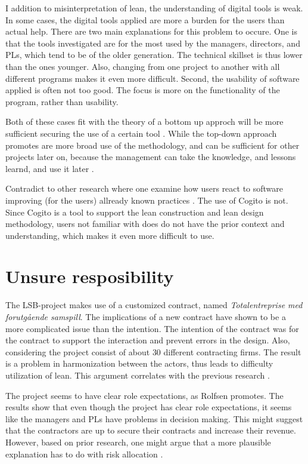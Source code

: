 I addition to misinterpretation of lean, the understanding of digital tools is weak. In some cases, the digital tools applied are more a burden for the users than actual help. There are two main explanations for this problem to occure. One is that the tools investigated are for the most used by the managers, directors, and PLs, which tend to be of the older generation. The technical skillset is thus lower than the ones younger. Also, changing from one project to another with all different programs makes it even more difficult. Second, the usability of software applied is often not too good. The focus is more on the functionality of the program, rather than usability. 

Both of these cases fit with the theory of a bottom up approch will be more sufficient securing the use of a certain tool \cite{Robey&Sahay}. While the top-down approach promotes are more broad use of the methodology, and can be sufficient for other projects later on, because the management can take the knowledge, and lessons learnd, and use it later \cite{lean_i_praksis}. 

Contradict to other research where one examine how users react to software improving (for the users) allready known practices \cite{o1999home,svanaes2010usability, nygren1992reading}. The use of Cogito is not. Since Cogito is a tool to support the lean construction and lean design methodology, users not familiar with does do not have the prior context and understanding, which makes it even more difficult to use. 

\section{Unsure resposibility} \label{sec:dis_responsibility}
The LSB-project makes use of a customized contract, named \textit{Totalentreprise med forutgående samspill}. The implications of a new contract have shown to be a more complicated issue than the intention. The intention of the contract was for the contract to support the interaction and prevent errors in the design. Also, considering the project consist of about 30 different contracting firms. The result is a problem in harmonization between the actors, thus leads to difficulty utilization of lean. This argument correlates with the previous research \cite{miller2002harmonization}.

The project seems to have clear role expectations, as Rolfsen promotes\cite{rolfsen}. The results show that even though the project has clear role expectations, it seems like the managers and PLs have problems in decision making. This might suggest that the contractors are up to secure their contracts and increase their revenue. However, based on prior research, one might argue that a more plausible explanation has to do with risk allocation \cite{zaghloul2003construction}. 

